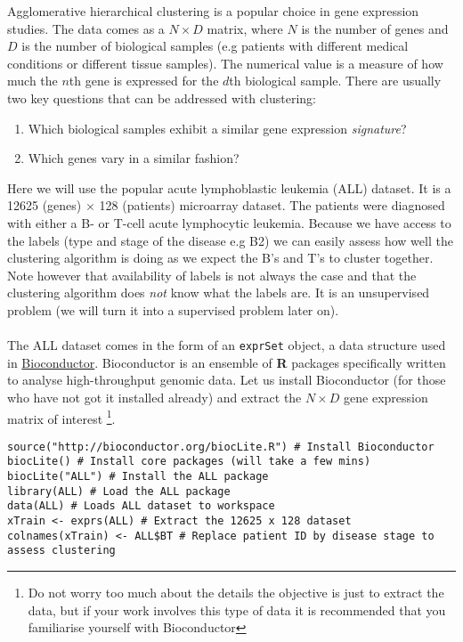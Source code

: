 \documentclass[a4paper,11pt]{article}
\begin{document}
Agglomerative hierarchical clustering is a popular choice in gene expression studies.
The data comes as a $N \times D$ matrix, where $N$ is the number of genes and $D$ is 
the number of biological samples (e.g patients with different medical conditions or 
different tissue samples). The numerical value is a measure of how much the $n$th gene
is expressed for the $d$th biological sample. There are usually two key questions that
can be addressed with clustering:

\begin{enumerate}
	\item Which biological samples exhibit a similar gene expression \textit{signature}?
	\item Which genes vary in a similar fashion?
\end{enumerate} 

Here we will use the popular acute lymphoblastic leukemia (ALL) dataset. It is a
12625 (genes) $\times$ 128 (patients) microarray dataset. The patients were diagnosed with 
either a B- or T-cell acute lymphocytic leukemia. Because we have access to the labels 
(type and stage of the disease e.g B2) we can easily assess how well the clustering 
algorithm is doing as we expect the B's and T's to cluster together. Note however 
that availability of labels is not always the case and that the clustering algorithm 
does \textit{not} know what the labels are. It is an unsupervised problem 
(we will turn it into a supervised problem later on).
\\\\
The ALL dataset comes in the form of an {\lstinline[style=RCode, basicstyle=\normalsize\ttfamily] |exprSet|} object,
a data structure used in \href{http://www.bioconductor.org}{Bioconductor}. Bioconductor is
an ensemble of \textbf{R} packages specifically written to analyse high-throughput genomic data.
Let us install Bioconductor (for those who have not got it installed already) and extract
the $N \times D$ gene expression matrix of interest \footnote{Do not worry too much about the details
the objective is just to extract the data, but if your work involves this type of data it is 
recommended that you familiarise yourself with Bioconductor}.
\\
\begin{lstlisting}[style=RCode]
source("http://bioconductor.org/biocLite.R") # Install Bioconductor
biocLite() # Install core packages (will take a few mins)
biocLite("ALL") # Install the ALL package
library(ALL) # Load the ALL package
data(ALL) # Loads ALL dataset to workspace
xTrain <- exprs(ALL) # Extract the 12625 x 128 dataset
colnames(xTrain) <- ALL$BT # Replace patient ID by disease stage to assess clustering
\end{lstlisting}
\end{document}
